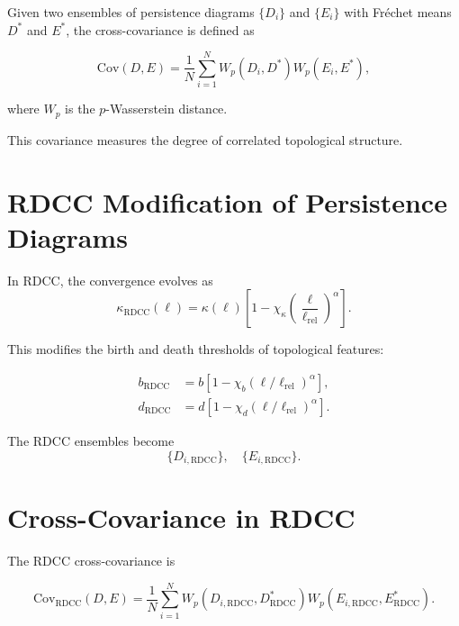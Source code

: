 \documentclass[11pt,a4paper]{article}
\begin{document}
Given two ensembles of persistence diagrams $\{D_{i}\}$ and $\{E_{i}\}$ with 
Fréchet means $D^{*}$ and $E^{*}$, the cross-covariance is defined as

\begin{equation}
    \mathrm{Cov}(D,E)
    = \frac{1}{N}
      \sum_{i=1}^{N}
      W_{p}(D_{i}, D^{*})
      W_{p}(E_{i}, E^{*}),
\end{equation}

where $W_{p}$ is the $p$-Wasserstein distance.

This covariance measures the degree of correlated topological structure.
\section{RDCC Modification of Persistence Diagrams}

In RDCC, the convergence evolves as
\begin{equation}
    \kappa_{\mathrm{RDCC}}(\ell)
    = \kappa(\ell)
      \left[
        1 - \chi_{\kappa}
        \left(\frac{\ell}{\ell_{\mathrm{rel}}}\right)^{\alpha}
      \right].
\end{equation}

This modifies the birth and death thresholds of topological features:

\begin{align}
    b_{\mathrm{RDCC}} &= b \left[ 1 - \chi_{b} (\ell/\ell_{\mathrm{rel}})^{\alpha} \right], \\
    d_{\mathrm{RDCC}} &= d \left[ 1 - \chi_{d} (\ell/\ell_{\mathrm{rel}})^{\alpha} \right].
\end{align}

The RDCC ensembles become
\begin{equation}
    \{ D_{i,\mathrm{RDCC}} \}, \quad
    \{ E_{i,\mathrm{RDCC}} \}.
\end{equation}
\section{Cross-Covariance in RDCC}

The RDCC cross-covariance is

\begin{equation}
    \mathrm{Cov}_{\mathrm{RDCC}}(D,E)
    = \frac{1}{N}
      \sum_{i=1}^{N}
      W_{p}(D_{i,\mathrm{RDCC}}, D^{*}_{\mathrm{RDCC}})
      W_{p}(E_{i,\mathrm{RDCC}}, E^{*}_{\mathrm{RDCC}}).
\end{equation}
\end{document}
